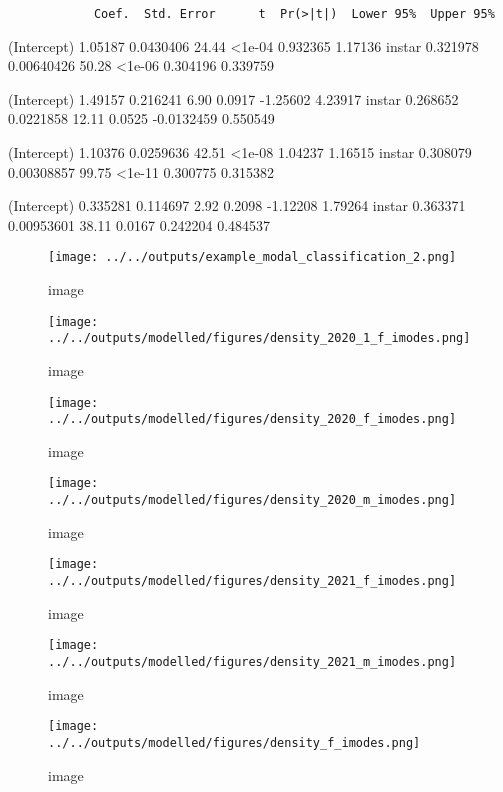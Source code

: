 \documentclass[12pt,letterpaper,]{paper}
\begin{document}
\begin{verbatim}
            Coef.  Std. Error      t  Pr(>|t|)  Lower 95%  Upper 95%
\end{verbatim}

(Intercept) 1.05187 0.0430406 24.44 \textless1e-04 0.932365 1.17136
instar 0.321978 0.00640426 50.28 \textless1e-06 0.304196 0.339759

(Intercept) 1.49157 0.216241 6.90 0.0917 -1.25602 4.23917 instar
0.268652 0.0221858 12.11 0.0525 -0.0132459 0.550549

(Intercept) 1.10376 0.0259636 42.51 \textless1e-08 1.04237 1.16515
instar 0.308079 0.00308857 99.75 \textless1e-11 0.300775 0.315382

(Intercept) 0.335281 0.114697 2.92 0.2098 -1.12208 1.79264 instar
0.363371 0.00953601 38.11 0.0167 0.242204 0.484537

\begin{figure}
\centering
\texttt{[image: ../../outputs/example\_modal\_classification\_2.png]}
\caption{image}
\end{figure}

\begin{figure}
\centering
\texttt{[image: ../../outputs/modelled/figures/density\_2020\_1\_f\_imodes.png]}
\caption{image}
\end{figure}

\begin{figure}
\centering
\texttt{[image: ../../outputs/modelled/figures/density\_2020\_f\_imodes.png]}
\caption{image}
\end{figure}

\begin{figure}
\centering
\texttt{[image: ../../outputs/modelled/figures/density\_2020\_m\_imodes.png]}
\caption{image}
\end{figure}

\begin{figure}
\centering
\texttt{[image: ../../outputs/modelled/figures/density\_2021\_f\_imodes.png]}
\caption{image}
\end{figure}

\begin{figure}
\centering
\texttt{[image: ../../outputs/modelled/figures/density\_2021\_m\_imodes.png]}
\caption{image}
\end{figure}

\begin{figure}
\centering
\texttt{[image: ../../outputs/modelled/figures/density\_f\_imodes.png]}
\caption{image}
\end{figure}
\end{document}
